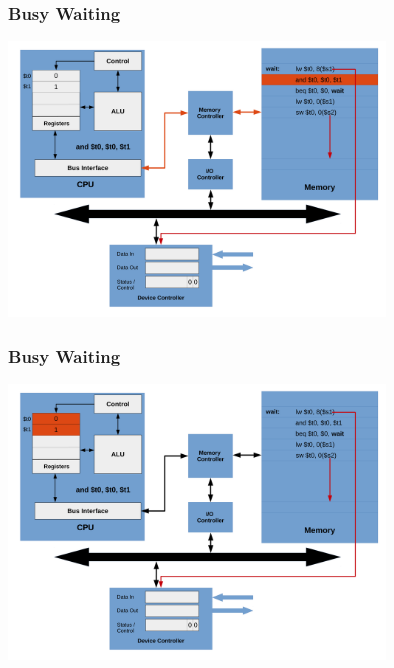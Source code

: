 \documentclass{beamer}
\begin{document}
\begin{frame}%
\frametitle{Busy Waiting}

\vspace*{-0.2cm}
\begin{center}
\hspace*{-1cm}\includegraphics[width=10cm]{busy_waiting5.pdf}
\end{center}

\end{frame}

\begin{frame}%
\frametitle{Busy Waiting}

\vspace*{-0.2cm}
\begin{center}
\hspace*{-1cm}\includegraphics[width=10cm]{busy_waiting6.pdf}
\end{center}

\end{frame}
\end{document}
